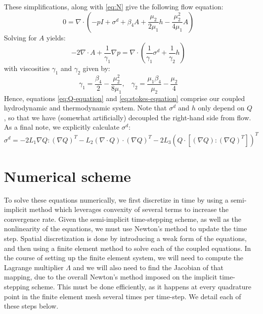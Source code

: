 \documentclass[reqno]{article}
\begin{document}
  These simplifications, along with \eqref{eq:N} give the following flow equation:
  \begin{equation} \label{eq:linearized-hydrodynamics}
    0
    =
    \nabla \cdot \left(
      -p I
      + \sigma^d
      + \beta_4 A
      + \frac{\mu_2}{2 \mu_1} h - \frac{\mu_2^2}{4 \mu_1} A
    \right)
  \end{equation}
  Solving for $A$ yields:
  \begin{equation} \label{eq:stokes-equation}
    -2 \nabla \cdot A + \frac{1}{\gamma_1} \nabla p
    =
    \nabla \cdot \left(
      \frac{1}{\gamma_1} \sigma^d
      + \frac{1}{\gamma_2} h
    \right)
  \end{equation}
  with viscosities $\gamma_1$ and $\gamma_2$ given by:
  \begin{equation}
    \gamma_1
    =
    \frac{\beta_4}{2} - \frac{\mu_2^2}{8 \mu_1},
    \:\:\:\:
    \gamma_2
    =
    \frac{\mu_1 \beta_4}{\mu_2} - \frac{\mu_2}{4}
  \end{equation}
  Hence, equations \eqref{eq:Q-equation} and \eqref{eq:stokes-equation} comprise
  our coupled hydrodynamic and thermodynamic system.
  Note that $\sigma^d$ and $h$ only depend on $Q$, so that we have (somewhat
  artificially) decoupled the right-hand side from flow.
  As a final note, we explicitly calculate $\sigma^d$:
  \begin{equation}
    \sigma^d
    =
    - 2 L_1 \nabla Q : \left( \nabla Q \right)^T
    - L_2 \left( \nabla \cdot Q \right) \cdot \left( \nabla Q \right)^T
    - 2 L_3 \left( Q \cdot \left[ \left( \nabla Q \right) : \left( \nabla Q \right)^T \right] \right)^T
  \end{equation}
  
  \section{Numerical scheme} \label{numerical-scheme}
  To solve these equations numerically, we first discretize in time by using a
  semi-implicit method which leverages convexity of several terms to increase
  the convergence rate.
  Given the semi-implicit time-stepping scheme, as well as the nonlinearity of
  the equations, we must use Newton's method to update the time step.
  Spatial discretization is done by introducing a weak form of the equations,
  and then using a finite element method to solve each of the coupled equations.
  In the course of setting up the finite element system, we will need to compute
  the Lagrange multiplier $\Lambda$ and we will also need to find the
  Jacobian of that mapping, due to the overall Newton's method imposed on the
  implicit time-stepping scheme.
  This must be done efficiently, as it happens at every quadrature point in the
  finite element mesh several times per time-step.
  We detail each of these steps below.
\end{document}
